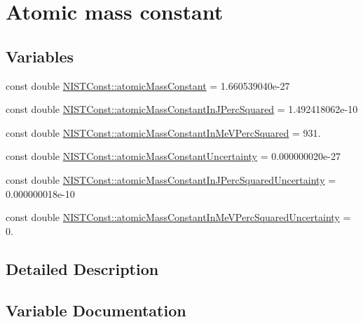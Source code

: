 \hypertarget{group___n_i_s_t_const-_atomic_mass_constant}{}\section{Atomic mass constant}
\label{group___n_i_s_t_const-_atomic_mass_constant}
\subsection*{Variables}
\begin{DoxyCompactItemize}
\item 
const double \hyperlink{group___n_i_s_t_const-_atomic_mass_constant_ga2c815ce73f942601621223bef09be40a}{N\+I\+S\+T\+Const\+::atomic\+Mass\+Constant} = 1.\+660539040e-\/27
\item 
const double \hyperlink{group___n_i_s_t_const-_atomic_mass_constant_ga59e3df8073f8ba5570bc3c9308655215}{N\+I\+S\+T\+Const\+::atomic\+Mass\+Constant\+In\+J\+Perc\+Squared} = 1.\+492418062e-\/10
\item 
const double \hyperlink{group___n_i_s_t_const-_atomic_mass_constant_ga8bf06e408e84fc35515a4d6564407467}{N\+I\+S\+T\+Const\+::atomic\+Mass\+Constant\+In\+Me\+V\+Perc\+Squared} = 931.
\item 
const double \hyperlink{group___n_i_s_t_const-_atomic_mass_constant_gae44d47135c3f8d9e2b9c981649443efc}{N\+I\+S\+T\+Const\+::atomic\+Mass\+Constant\+Uncertainty} = 0.\+000000020e-\/27
\item 
const double \hyperlink{group___n_i_s_t_const-_atomic_mass_constant_ga297ea3567a4df316bd697b4ec0dc0a65}{N\+I\+S\+T\+Const\+::atomic\+Mass\+Constant\+In\+J\+Perc\+Squared\+Uncertainty} = 0.\+000000018e-\/10
\item 
const double \hyperlink{group___n_i_s_t_const-_atomic_mass_constant_ga797d82fd682854b4c1b88754bed2e70a}{N\+I\+S\+T\+Const\+::atomic\+Mass\+Constant\+In\+Me\+V\+Perc\+Squared\+Uncertainty} = 0.
\end{DoxyCompactItemize}


\subsection{Detailed Description}


\subsection{Variable Documentation}
\mbox{\label{group___n_i_s_t_const-_atomic_mass_constant_ga2c815ce73f942601621223bef09be40a}} 
